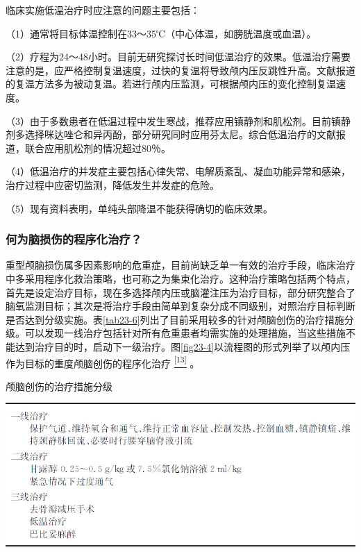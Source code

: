 临床实施低温治疗时应注意的问题主要包括：

（1）通常将目标体温控制在33～35℃（中心体温，如膀胱温度或血温）。

（2）疗程为24～48小时。目前无研究探讨长时间低温治疗的效果。低温治疗需要注意的是，应严格控制复温速度，过快的复温将导致颅内压反跳性升高。文献报道的复温方法多为被动复温。若进行颅内压监测，可根据颅内压的变化控制复温速度。

（3）由于多数患者在低温过程中发生寒战，推荐应用镇静剂和肌松剂。目前镇静剂多选择咪达唑仑和异丙酚，部分研究同时应用芬太尼。综合低温治疗的文献报道，联合应用肌松剂的情况超过80％。

（4）低温治疗的并发症主要包括心律失常、电解质紊乱、凝血功能异常和感染，治疗过程中应密切监测，降低发生并发症的危险。

（5）现有资料表明，单纯头部降温不能获得确切的临床效果。

\subsubsection{何为脑损伤的程序化治疗？}

重型颅脑损伤属多因素影响的危重症，目前尚缺乏单一有效的治疗手段，临床治疗中多采用程序化救治策略，也可称之为集束化治疗。这种治疗策略包括两个特点，首先是设定治疗目标，现在多选择颅内压或脑灌注压为治疗目标，部分研究整合了脑氧监测目标；其次是将治疗手段由简单到复杂分成不同级别，对照治疗目标判断是否达到分级实施。表\ref{tab23-6}列出了目前采用较多的针对颅脑创伤的治疗措施分级。可以发现一线治疗包括针对所有危重患者均需实施的处理措施，当这些措施不能达到治疗目的时，启动下一级治疗。图\ref{fig23-4}以流程图的形式列举了以颅内压作为目标的重度颅脑创伤的程序化治疗
\protect\hyperlink{text00029.htmlux5cux23ch13-28}{\textsuperscript{{[}13{]}}}
。

\begin{table}[htbp]
\centering
\caption{颅脑创伤的治疗措施分级}
\label{tab23-6}
\includegraphics{./images/Image00277.jpg}
\end{table}

